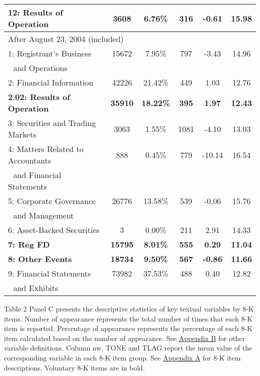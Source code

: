 \begin{table}[H]
\begin{center}
\begin{tabular}{lccccc}
  		\textbf{12: Results of Operation} & \textbf{3608} & \textbf{6.76\%} & \textbf{316} & \textbf{-0.61} & \textbf{15.98} \\
  		\midrule
  		\multicolumn{6}{l}{After August 23, 2004 (included)} \\
  		\midrule
  		1: Registrant's Business & 15672 & 7.95\% & 797 & -3.43 & 14.96 \\
  		\: \,\, and Operations & &  &  &  & \\
  		2: Financial Information & 42226 & 21.42\% & 449 & 1.03 & 12.76 \\
  		\textbf{2.02: Results of Operation} & \textbf{35910} & \textbf{18.22\%} & \textbf{395} & \textbf{1.97} & \textbf{12.43} \\
  		3: Securities and Trading Markets & 3063 & 1.55\% & 1081 & -4.10 & 13.03 \\
  		4: Matters Related to Accountants & 888 & 0.45\% & 779 & -10.14 & 16.54 \\
  		\: \,\, and Financial Statements & &  &  &  & \\
  		5: Corporate Governance & 26776 & 13.58\% & 539 & -0.06 & 15.76 \\
  		\: \,\, and Management & &  &  &  & \\
  		6: Asset-Backed Securities & 3 & 0.00\% & 211 & 2.91 & 14.33 \\
  		\textbf{7: Reg FD} & \textbf{15795} & \textbf{8.01\%} & \textbf{555} & \textbf{0.29} & \textbf{11.04} \\
  		\textbf{8: Other Events} & \textbf{18734} & \textbf{9.50\%} & \textbf{567} & \textbf{-0.86} & \textbf{11.66} \\
  		9: Financial Statements & 73982 & 37.53\% & 488 & 0.40 & 12.82 \\
  		\: \,\, and Exhibits & &  &  &  & \\
  		\bottomrule
  		\bottomrule
  	\end{tabular}%
  \end{center}
	\begin{footnotesize}
		\noindent Table 2 Panel C presents the descriptive statistics of key textual variables by 8-K items. Number of appearance represents the total number of times that each 8-K item is reported. Percentage of appearance represents the percentage of each 8-K item calculated based on the number of appearance. See \hyperref[appb]{Appendix B} for other variable definitions. Column nw, TONE and TLAG report the mean value of the corresponding variable in each 8-K item group. See \hyperref[appa]{Appendix A} for 8-K item descriptions. Voluntary 8-K items are in bold.
	\end{footnotesize}
\end{table}%
